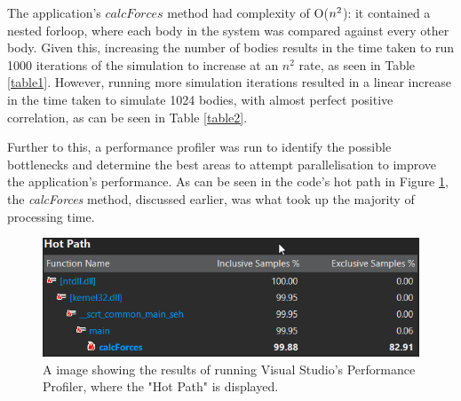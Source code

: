 \documentclass[12pt,journal,transmag]{IEEEtran}
\begin{document}
	\begin{table}[!h]
		\caption{1024 bodies Sequential Algorithm Performance}
		\label{table2}
		\centering
	\end{table}
	
	The application's $calcForces$ method had complexity of O($n\textsuperscript{2}$): it contained a nested forloop, where each body in the system was compared against every other body. Given this, increasing the number of bodies results in the time taken to run 1000 iterations of the simulation to increase at an $n^2$ rate, as seen in Table \ref{table1}. However, running more simulation iterations resulted in a linear increase in the time taken to simulate 1024 bodies, with almost perfect positive correlation, as can be seen in Table \ref{table2}.
	
	Further to this, a performance profiler was run to identify the possible bottlenecks and determine the best areas to attempt parallelisation to improve the application's performance. As can be seen in the code's hot path in Figure \ref{figure1}, the \textit{calcForces} method, discussed earlier, was what took up the majority of processing time.
	
	\begin{figure}[!h]
		\centering
		\includegraphics[width=\columnwidth]{IMAGES/hotpath}
		\caption{A image showing the results of running Visual Studio's Performance Profiler, where the "Hot Path" is displayed.}
		\label{figure1}
	\end{figure}
	
\end{document}
